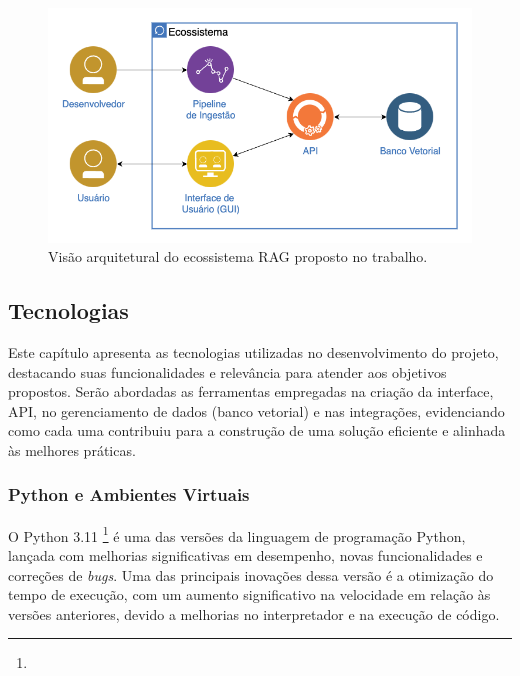\documentclass[a4paper, 12pt]{article}
\begin{document}
    \begin{figure}[ht]
        \includegraphics[width=\textwidth,height=0.9\textheight,keepaspectratio]{ecosystem.png}
        \centering
        \caption{Visão arquitetural do ecossistema RAG proposto no trabalho.}
        \centering
        \label{fig:ecosystem}
    \end{figure}

    \clearpage

    \subsection{Tecnologias} \label{sec:technologies}

    Este capítulo apresenta as tecnologias utilizadas no desenvolvimento do projeto, destacando suas funcionalidades e relevância para atender aos objetivos propostos. Serão abordadas as ferramentas empregadas na criação da interface, API, no gerenciamento de dados (banco vetorial) e nas integrações, evidenciando como cada uma contribuiu para a construção de uma solução eficiente e alinhada às melhores práticas.

    \subsubsection{Python e Ambientes Virtuais} \label{sec:python}
    
    O Python 3.11 \footnote{} é uma das versões da linguagem de programação Python, lançada com melhorias significativas em desempenho, novas funcionalidades e correções de \textit{bugs}. Uma das principais inovações dessa versão é a otimização do tempo de execução, com um aumento significativo na velocidade em relação às versões anteriores, devido a melhorias no interpretador e na execução de código. 
    
\end{document}
